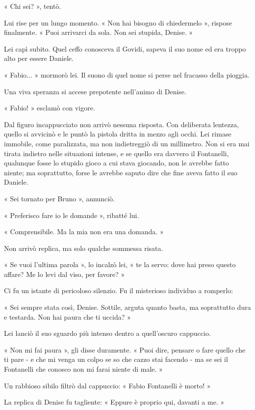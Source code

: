« Chi sei? », tentò.

Lui rise per un lungo momento. « Non hai bisogno di chiedermelo », rispose finalmente. « Puoi arrivarci da sola. Non sei stupida, Denise. »

Lei capì subito. Quel ceffo conosceva il Govidi, sapeva il suo nome ed era troppo alto per essere Daniele.

« Fabio... » mormorò lei. Il suono di quel nome si perse nel fracasso della pioggia.

Una viva speranza si accese prepotente nell'animo di Denise.

« Fabio! » esclamò con vigore.

Dal figuro incappucciato non arrivò nessuna risposta. Con deliberata lentezza, quello si avvicinò e le puntò la pistola dritta in mezzo agli occhi. Lei rimase immobile, come paralizzata, ma non indietreggiò di un millimetro. Non si era mai tirata indietro nelle situazioni intense, e se quello era davvero il Fontanelli, qualunque fosse lo stupido gioco a cui stava giocando, non le avrebbe fatto niente; ma soprattutto, forse le avrebbe saputo dire che fine aveva fatto il suo Daniele.

« Sei tornato per Bruno », annunciò.

« Preferisco fare io le domande », ribatté lui.

« Comprensibile. Ma la mia non era una domanda. »

Non arrivò replica, ma solo qualche sommessa risata.

« Se vuoi l'ultima parola », lo incalzò lei, « te la servo: dove hai preso questo affare? Me lo levi dal viso, per favore? »

Ci fu un istante di pericoloso silenzio. Fu il misterioso individuo a romperlo:

« Sei sempre stata così, Denise. Sottile, arguta quanto basta, ma soprattutto dura e testarda. Non hai paura che ti uccida? »

Lei lanciò il suo sguardo più intenso dentro a quell'oscuro cappuccio.

« Non mi fai paura », gli disse duramente. « Puoi dire, pensare o fare quello che ti pare - e che mi venga un colpo se so che cazzo stai facendo - ma se sei il Fontanelli che conosco non mi farai niente di male. »

Un rabbioso sibilo filtrò dal cappuccio: « Fabio Fontanelli è morto! »

La replica di Denise fu tagliente: « Eppure è proprio qui, davanti a me. »

